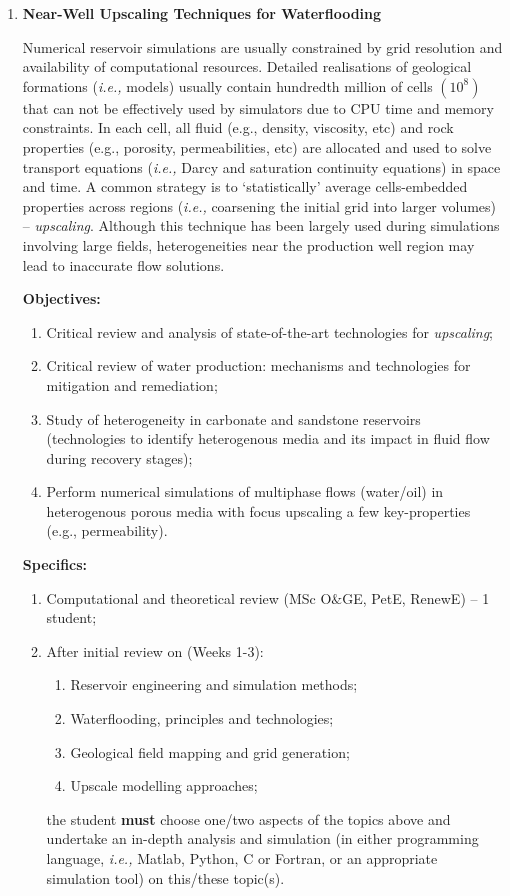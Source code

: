 \documentclass[12pts,a4paper,amsmath,amssymb,floatfix]{article}%
\newcommand{\MSc}{MSc O$\&$GE, PetE, RenewE}
\newcommand{\ie}{{\it i.e., }}
\begin{document}
\begin{enumerate}[label=\bfseries Project: \arabic*:]
\clearpage


\item {\bf Near-Well Upscaling Techniques for Waterflooding}

Numerical reservoir simulations are usually constrained by grid resolution and availability of computational resources. Detailed realisations of geological formations (\ie models) usually contain hundredth million of cells $\left(\text{10}^{8}\right)$ that can not be effectively used by simulators due to CPU time and memory constraints.  In each cell, all fluid (e.g., density, viscosity, etc) and rock properties (e.g., porosity, permeabilities, etc) are allocated and used to solve transport equations (\ie Darcy and saturation continuity equations) in space and time. A common strategy is to `statistically' average cells-embedded properties across regions (\ie coarsening the initial grid into larger volumes) -- {\it upscaling}.  Although this technique has been largely used during simulations involving large fields, heterogeneities near the production well region may lead to inaccurate flow solutions. 


\noindent
{\bf Objectives:}
\begin{enumerate}
\item Critical review and analysis of state-of-the-art technologies for {\it upscaling};
\item Critical review of water production: mechanisms and technologies for mitigation and remediation;
\item Study of heterogeneity in carbonate and sandstone reservoirs (technologies to identify heterogenous media and its impact in fluid flow during recovery stages);
\item Perform numerical simulations of multiphase flows (water/oil) in heterogenous porous media with focus upscaling a few key-properties (e.g., permeability).  
\end{enumerate}

\noindent
{\bf Specifics:} 
\begin{enumerate}
\item Computational and theoretical review (\MSc) -- 1 student;
\item After initial review on (Weeks 1-3):
   \begin{enumerate}
       \item Reservoir engineering and simulation methods;
       \item Waterflooding, principles and technologies;
       \item Geological field mapping and grid generation;
       \item Upscale modelling approaches;
   \end{enumerate}
the student {\bf must} choose one/two aspects of the topics above and undertake an in-depth analysis and simulation (in either programming language, \ie Matlab, Python, C or Fortran, or an appropriate simulation tool) on this/these topic(s).
\end{enumerate}



\end{enumerate}
\end{document}
